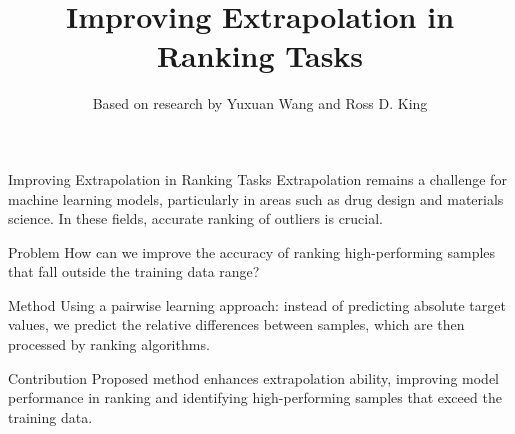 \documentclass[12pt,pdf,hyperref={unicode}]{beamer}
\title{Improving Extrapolation in Ranking Tasks}
\author{Based on research by Yuxuan Wang and Ross D. King}
\date{}
\begin{document}
\begin{frame}{Improving Extrapolation in Ranking Tasks}
    \small
    Extrapolation remains a challenge for machine learning models, particularly in areas such as drug design and materials science. In these fields, accurate ranking of outliers is crucial.
    \vfill
    \begin{block}{Problem}
        How can we improve the accuracy of ranking high-performing samples that fall outside the training data range?
    \end{block}
    \vfill
    \begin{block}{Method}
        Using a pairwise learning approach: instead of predicting absolute target values, we predict the relative differences between samples, which are then processed by ranking algorithms.
    \end{block}
    \vfill
    \begin{block}{Contribution}
        Proposed method enhances extrapolation ability, improving model performance in ranking and identifying high-performing samples that exceed the training data.
    \end{block}
\end{frame}
\end{document}
